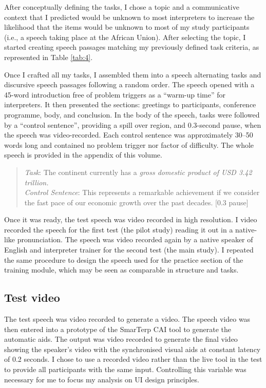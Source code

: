 After conceptually defining the tasks, I chose a topic and a communicative context that I predicted would be unknown to most interpreters to increase the likelihood that the items would be unknown to most of my study participants (i.e., a speech taking place at the African Union). After selecting the topic, I started creating speech passages matching my previously defined task criteria, as represented in Table \ref{tab:4}.

Once I crafted all my tasks, I assembled them into a speech alternating tasks and discursive speech passages following a random order. The speech opened with a 45-word introduction free of problem triggers as a ``warm-up time'' for interpreters. It then presented the sections: greetings to participants, conference programme, body, and conclusion. In the body of the speech, tasks were followed by a ``control sentence'', providing a spill over region, and 0.3-second pause, when the speech was video-recorded. Each control sentence was approximately 30--50 words long and contained no problem trigger nor factor of difficulty. The whole speech is provided in the appendix of this volume.
\begin{quote}
\textit{Task}: The continent currently has a \textit{gross domestic product of USD 3.42 trillion.}\\
\textit{Control Sentence}: This represents a remarkable achievement if we consider the fast pace of our economic growth over the past decades. [0.3 pause]
\end{quote}
Once it was ready, the test speech was video recorded in high resolution. I video recorded the speech for the first test (the pilot study) reading it out in a native-like pronunciation. The speech was video recorded again by a native speaker of English and interpreter trainer for the second test (the main study). I repeated the same procedure to design the speech used for the practice section of the training module, which may be seen as comparable in structure and tasks.



\subsection{Test video}



The test speech was video recorded to generate a video. The speech video was then entered into a prototype of the SmarTerp CAI tool to generate the automatic aids. The output was video recorded to generate the final video showing the speaker’s video with the synchronised visual aids at constant latency of 0.2 seconds. I chose to use a recorded video rather than the live tool in the test to provide all participants with the same input. Controlling this variable was necessary for me to focus my analysis on UI design principles.



